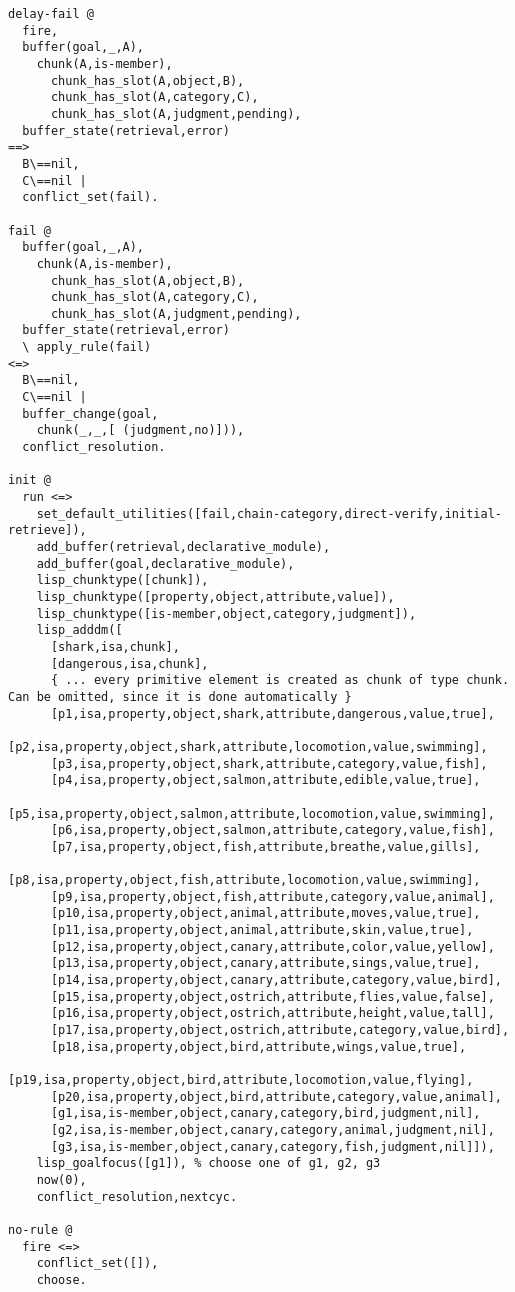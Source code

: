 \begin{lstlisting}[caption={Translated production rules for the semantic model in CHR}]
delay-fail @
  fire,
  buffer(goal,_,A),
    chunk(A,is-member),
      chunk_has_slot(A,object,B),
      chunk_has_slot(A,category,C),
      chunk_has_slot(A,judgment,pending),
  buffer_state(retrieval,error)
==>
  B\==nil,
  C\==nil |
  conflict_set(fail).
  
fail @
  buffer(goal,_,A),
    chunk(A,is-member),
      chunk_has_slot(A,object,B),
      chunk_has_slot(A,category,C),
      chunk_has_slot(A,judgment,pending),
  buffer_state(retrieval,error)
  \ apply_rule(fail)
<=>
  B\==nil,
  C\==nil |
  buffer_change(goal,
    chunk(_,_,[ (judgment,no)])),
  conflict_resolution.
  
init @
  run <=>
    set_default_utilities([fail,chain-category,direct-verify,initial-retrieve]),
    add_buffer(retrieval,declarative_module),
    add_buffer(goal,declarative_module),
    lisp_chunktype([chunk]),
    lisp_chunktype([property,object,attribute,value]),
    lisp_chunktype([is-member,object,category,judgment]),
    lisp_adddm([
      [shark,isa,chunk],
      [dangerous,isa,chunk],
      { ... every primitive element is created as chunk of type chunk. Can be omitted, since it is done automatically }
      [p1,isa,property,object,shark,attribute,dangerous,value,true],
      [p2,isa,property,object,shark,attribute,locomotion,value,swimming],
      [p3,isa,property,object,shark,attribute,category,value,fish],
      [p4,isa,property,object,salmon,attribute,edible,value,true],
      [p5,isa,property,object,salmon,attribute,locomotion,value,swimming],
      [p6,isa,property,object,salmon,attribute,category,value,fish],
      [p7,isa,property,object,fish,attribute,breathe,value,gills],
      [p8,isa,property,object,fish,attribute,locomotion,value,swimming],
      [p9,isa,property,object,fish,attribute,category,value,animal],
      [p10,isa,property,object,animal,attribute,moves,value,true],
      [p11,isa,property,object,animal,attribute,skin,value,true],
      [p12,isa,property,object,canary,attribute,color,value,yellow],
      [p13,isa,property,object,canary,attribute,sings,value,true],
      [p14,isa,property,object,canary,attribute,category,value,bird],
      [p15,isa,property,object,ostrich,attribute,flies,value,false],
      [p16,isa,property,object,ostrich,attribute,height,value,tall],
      [p17,isa,property,object,ostrich,attribute,category,value,bird],
      [p18,isa,property,object,bird,attribute,wings,value,true],
      [p19,isa,property,object,bird,attribute,locomotion,value,flying],
      [p20,isa,property,object,bird,attribute,category,value,animal],
      [g1,isa,is-member,object,canary,category,bird,judgment,nil],
      [g2,isa,is-member,object,canary,category,animal,judgment,nil],
      [g3,isa,is-member,object,canary,category,fish,judgment,nil]]),
    lisp_goalfocus([g1]), % choose one of g1, g2, g3
    now(0),
    conflict_resolution,nextcyc.

no-rule @
  fire <=>
    conflict_set([]),
    choose.
\end{lstlisting}


